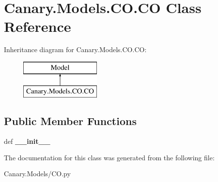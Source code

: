 \hypertarget{class_canary_8_models_1_1_c_o_1_1_c_o}{\section{Canary.\-Models.\-C\-O.\-C\-O Class Reference}
\label{class_canary_8_models_1_1_c_o_1_1_c_o}
}
Inheritance diagram for Canary.\-Models.\-C\-O.\-C\-O\-:\begin{figure}[H]
\begin{center}
\leavevmode
\includegraphics[height=2.000000cm]{class_canary_8_models_1_1_c_o_1_1_c_o}
\end{center}
\end{figure}
\subsection*{Public Member Functions}
\begin{DoxyCompactItemize}
\item 
\hypertarget{class_canary_8_models_1_1_c_o_1_1_c_o_a84ae7c15dfc4efb90df39b3fe33a6bbb}{def {\bfseries \-\_\-\-\_\-init\-\_\-\-\_\-}}\label{class_canary_8_models_1_1_c_o_1_1_c_o_a84ae7c15dfc4efb90df39b3fe33a6bbb}

\end{DoxyCompactItemize}


The documentation for this class was generated from the following file\-:\begin{DoxyCompactItemize}
\item 
Canary.\-Models/C\-O.\-py\end{DoxyCompactItemize}
